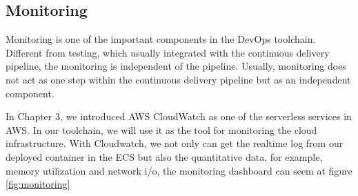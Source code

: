 \subsection{Monitoring}
Monitoring is one of the important components in the DevOps toolchain. Different from testing, which usually integrated with the continuous delivery pipeline, the monitoring is independent of the pipeline. Usually, monitoring does not act as one step within the continuous delivery pipeline but as an independent component.
\par
In Chapter 3, we introduced AWS CloudWatch as one of the serverless services in AWS. In our toolchain, we will use it as the tool for monitoring the cloud infrastructure. With Cloudwatch, we not only can get the realtime log from our deployed container in the ECS but also the quantitative data, for example, memory utilization and network i/o, the monitoring dashboard can seem at figure \ref{fig:monitoring}
